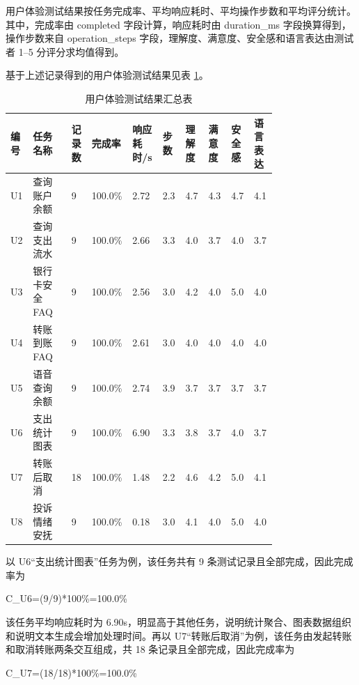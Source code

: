 \documentclass[bachelor, print]{xduthesis}
\begin{document}
用户体验测试结果按任务完成率、平均响应耗时、平均操作步数和平均评分统计。其中，完成率由 completed 字段计算，响应耗时由 duration\_ms 字段换算得到，操作步数来自 operation\_steps 字段，理解度、满意度、安全感和语言表达由测试者 1--5 分评分求均值得到。

基于上述记录得到的用户体验测试结果见表 \ref{tab:user-experience-summary}。

\begin{table}[H]
    \centering
    \caption{用户体验测试结果汇总表}
    \label{tab:user-experience-summary}
    \scriptsize
    \setlength{\tabcolsep}{2pt}
    \begin{tabular}{|p{0.06\linewidth}|p{0.14\linewidth}|p{0.07\linewidth}|p{0.07\linewidth}|p{0.07\linewidth}|p{0.07\linewidth}|p{0.07\linewidth}|p{0.07\linewidth}|p{0.07\linewidth}|p{0.07\linewidth}|}
        \hline
        编号 & 任务名称 & 记录数 & 完成率 & 响应耗时/s & 步数 & 理解度 & 满意度 & 安全感 & 语言表达 \\
        \hline
        U1 & 查询账户余额 & 9 & 100.0\% & 2.72 & 2.3 & 4.7 & 4.3 & 4.7 & 4.1 \\
        \hline
        U2 & 查询支出流水 & 9 & 100.0\% & 2.66 & 3.3 & 4.0 & 3.7 & 4.0 & 3.7 \\
        \hline
        U3 & 银行卡安全 FAQ & 9 & 100.0\% & 2.56 & 3.0 & 4.2 & 4.0 & 5.0 & 4.0 \\
        \hline
        U4 & 转账到账 FAQ & 9 & 100.0\% & 2.61 & 3.0 & 4.0 & 4.0 & 4.0 & 4.0 \\
        \hline
        U5 & 语音查询余额 & 9 & 100.0\% & 2.74 & 3.9 & 3.7 & 3.7 & 3.7 & 3.7 \\
        \hline
        U6 & 支出统计图表 & 9 & 100.0\% & 6.90 & 3.3 & 3.8 & 3.7 & 4.0 & 3.7 \\
        \hline
        U7 & 转账后取消 & 18 & 100.0\% & 1.48 & 2.2 & 4.6 & 4.2 & 5.0 & 4.1 \\
        \hline
        U8 & 投诉情绪安抚 & 9 & 100.0\% & 0.18 & 3.0 & 4.1 & 4.0 & 5.0 & 4.0 \\
        \hline
    \end{tabular}
\end{table}

以 U6“支出统计图表”任务为例，该任务共有 9 条测试记录且全部完成，因此完成率为
\begin{center}
\textrm{C\_U6=(9/9)*100\%=100.0\%}
\end{center}
该任务平均响应耗时为 6.90s，明显高于其他任务，说明统计聚合、图表数据组织和说明文本生成会增加处理时间。再以 U7“转账后取消”为例，该任务由发起转账和取消转账两条交互组成，共 18 条记录且全部完成，因此完成率为
\begin{center}
\textrm{C\_U7=(18/18)*100\%=100.0\%}
\end{center}
\end{document}
